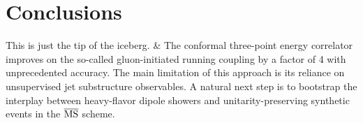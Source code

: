 \section{Conclusions}\label{sec:conclusions}

This is just the tip of the iceberg. & The conformal three-point energy
correlator improves on the so-called gluon-initiated running coupling by
a factor of 4 with unprecedented accuracy. The main limitation of this
approach is its reliance on unsupervised jet substructure observables. A
natural next step is to bootstrap the interplay between heavy-flavor
dipole showers and unitarity-preserving synthetic events in the
$\overline{\rm MS}$ scheme.


